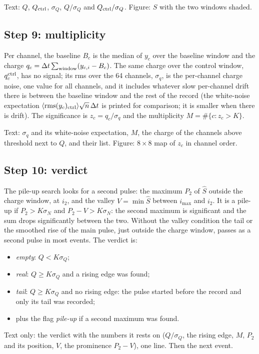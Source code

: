 \documentclass[11pt]{article}
\begin{document}
Text: $Q$, $Q_{\rm ctrl}$, $\sigma_Q$, $Q/\sigma_Q$ and $Q_{\rm
ctrl}/\sigma_Q$. Figure: $S$ with the two windows shaded.

\subsection{Step 9: multiplicity}

Per channel, the baseline $B_c$ is the median of $y_c$ over the baseline
window and the charge $q_c = \Delta t \sum_{\rm window} (y_{c,i} - B_c)$.
The same charge over the control window, $q_c^{\rm ctrl}$, has no signal;
its rms over the 64 channels, $\sigma_q$, is the per-channel charge noise,
one value for all channels, and it includes whatever slow per-channel
drift there is between the baseline window and the rest of the record
(the white-noise expectation $\langle\mathrm{rms}(y_c)_{\rm
ctrl}\rangle\sqrt{n}\,\Delta t$ is printed for comparison; it is smaller
when there is drift). The significance is $z_c = q_c / \sigma_q$ and the
multiplicity $M = \#\{c : z_c > K\}$.

Text: $\sigma_q$ and its white-noise expectation, $M$, the charge of the
channels above threshold next to $Q$, and their list. Figure: $8\times8$
map of $z_c$ in channel order.

\subsection{Step 10: verdict}

The pile-up search looks for a second pulse: the maximum $P_2$ of $\hat S$
outside the charge window, at $i_2$, and the valley $V = \min \hat S$
between $i_{\max}$ and $i_2$. It is a pile-up if $P_2 > K\sigma_N$ and
$P_2 - V > K\sigma_N$: the second maximum is significant and the sum
drops significantly between the two. Without the valley condition the
tail or the smoothed rise of the main pulse, just outside the charge
window, passes as a second pulse in most events. The verdict is:
\begin{itemize}
\item \emph{empty}: $Q < K \sigma_Q$;
\item \emph{real}: $Q \ge K \sigma_Q$ and a rising edge was found;
\item \emph{tail}: $Q \ge K \sigma_Q$ and no rising edge: the pulse started before the record and only its tail was recorded;
\item plus the flag \emph{pile-up} if a second maximum was found.
\end{itemize}
Text only: the verdict with the numbers it rests on ($Q/\sigma_Q$, the
rising edge, $M$, $P_2$ and its position, $V$, the prominence $P_2 - V$),
one line. Then the next event.
\end{document}
